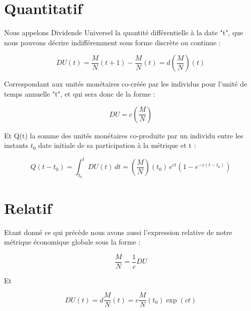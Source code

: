 \documentclass[a4paper,oneside,12pt]{article}
\begin{document}
\section{Quantitatif}
Nous appelons Dividende Universel la quantité différentielle à la date "t", que nous pouvons décrire indifféremment sous forme discrète ou continue :

\begin{center}
\begin{displaymath}DU(t)=\frac{M}{N}(t+1)-\frac{M}{N}(t)=d \left( \frac{M}{N} \right) (t)\end{displaymath}
\end{center}

Correspondant aux unités monétaires co-créée par les individus pour l'unité de temps annuelle "t", et qui sera donc de la forme :

\begin{center}
\begin{displaymath}DU=c \left( \frac{M}{N} \right) \end{displaymath}
\end{center}

Et Q(t) la somme des unités monétaires co-produite par un individu entre les instants $t_{0}$ date initiale de sa participation à la métrique et t :

\begin{center}
\begin{displaymath}Q(t-t_{0})=\int_{t_{0}}^t DU(t) \, dt = \left( \frac{M}{N} \right)(t_{0}) \, e^{ct} \left(1 - e^{-c(t-t_{0})} \right) \end{displaymath}
\end{center}



\section{Relatif}
Etant donné ce qui précède nous avons aussi l'expression relative de notre métrique économique globale sous la forme :

\begin{center}
\begin{displaymath}\frac{M}{N}=\frac{1}{c} DU\end{displaymath}
\end{center}

Et

\begin{center}
\begin{displaymath}DU(t)=d\frac{M}{N}(t) = c \frac{M}{N}(t_{0})\exp(ct)\end{displaymath}
\end{center}
\end{document}
